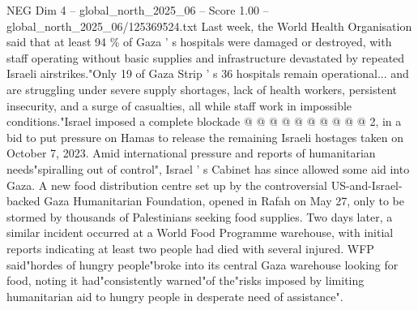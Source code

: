 \begin{textsample}{NEG Dim 4 – global\_north\_2025\_06 – Score 1.00 – global\_north\_2025\_06/125369524.txt}
Last week, the World Health Organisation said that at least 94 \% of Gaza ' s hospitals were damaged or destroyed, with staff operating without basic supplies and infrastructure devastated by repeated Israeli airstrikes."Only 19 of Gaza Strip ' s 36 hospitals remain operational... and are struggling under severe supply shortages, lack of health workers, persistent insecurity, and a surge of casualties, all while staff work in impossible conditions."Israel imposed a complete blockade @ @ @ @ @ @ @ @ @ @ 2, in a bid to put pressure on Hamas to release the remaining Israeli hostages taken on October 7, 2023.
Amid international pressure and reports of humanitarian needs"spiralling out of control", Israel ' s Cabinet has since allowed some aid into Gaza.
A new food distribution centre set up by the controversial US-and-Israel-backed Gaza Humanitarian Foundation, opened in Rafah on May 27, only to be stormed by thousands of Palestinians seeking food supplies.
Two days later, a similar incident occurred at a World Food Programme warehouse, with initial reports indicating at least two people had died with several injured.
WFP said"hordes of hungry people"broke into its central Gaza warehouse looking for food, noting it had"consistently warned"of the"risks imposed by limiting humanitarian aid to hungry people in desperate need of assistance".

\end{textsample}
